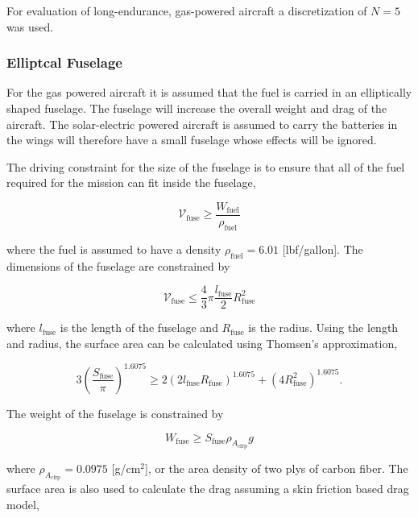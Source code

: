     For evaluation of long-endurance, gas-powered aircraft a discretization of $N=5$ was used. 

\subsubsection{Elliptcal Fuselage}

For the gas powered aircraft it is assumed that the fuel is carried in an elliptically shaped fuselage.  The fuselage will increase the overall weight and drag of the aircraft.  The solar-electric powered aircraft is assumed to carry the batteries in the wings will therefore have a small fuselage whose effects will be ignored.  

The driving constraint for the size of the fuselage is to ensure that all of the fuel required for the mission can fit inside the fuselage, 

\begin{equation}
    \label{e:fusevol}
    \mathcal{V}_{\text{fuse}} \geq \frac{W_\text{fuel}}{\rho_\text{fuel}}
\end{equation}

where the fuel is assumed to have a density $\rho_\text{fuel} = 6.01$ [lbf/gallon].  The dimensions of the fuselage are constrained by

\begin{equation}
    \label{e:fusevol2}
    \mathcal{V}_{\text{fuse}} \leq \frac{4}{3}\pi \frac{l_{\text{fuse}}}{2}R_{\text{fuse}}^2
\end{equation}

where $l_{\text{fuse}}$ is the length of the fuselage and $R_{\text{fuse}}$ is the radius. Using the length and radius, the surface area can be calculated using Thomsen's approximation,\cite{ellipsoidSA}

\begin{equation}
    \label{e:fusesa}
    3 \left( \frac{S_{\text{fuse}}}{\pi} \right)^{1.6075} \geq 2(2l_{\text{fuse}}R_{\text{fuse}})^{1.6075} + (4R_{\text{fuse}}^2)^{1.6075}.
\end{equation}

The weight of the fuselage is constrained by

\begin{equation}
    \label{e:fuseweight}
    W_{\text{fuse}} \geq S_{\text{fuse}} \rho_{A_{\text{cfrp}}} g
\end{equation} 

where $\rho_{A_{\text{cfrp}}} = 0.0975$ [g/cm$^2$], or the area density of two plys of carbon fiber.\cite{cfply}  The surface area is also used to calculate the drag assuming a skin friction based drag model,

